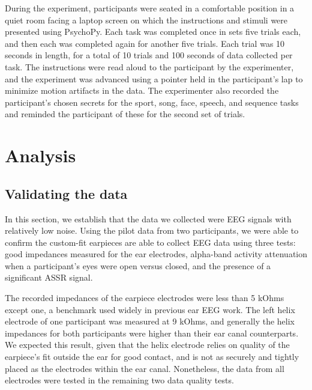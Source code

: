 \documentclass[11pt]{article}
\begin{document}
During the experiment, participants were seated in a comfortable position in a quiet room facing a laptop screen on which the
instructions and stimuli were presented using PsychoPy. Each task was completed once in sets five trials each, and then
each was completed again for another five trials. Each trial was 10 seconds in length, for a total of 10 trials and 
100 seconds of data collected per task. The instructions were read aloud to the participant by the experimenter, and
the experiment was advanced using a pointer held in the participant's lap to minimize motion artifacts in the data.  
The experimenter also recorded the participant's chosen secrets for the sport, song, face, speech, and sequence
 tasks and reminded the participant of these for the second set of trials.
\section{Analysis}
\label{sec:org6c1a839}
\subsection{Validating the data}
\label{sec:org800f2bd}

In this section, we establish that the data we collected were EEG signals with relatively low noise. 
Using the pilot data from two participants, we were able to confirm the custom-fit earpieces are able to collect EEG
data using three tests: good impedances measured for the ear electrodes, alpha-band activity attenuation when a
participant's eyes were open versus closed, and the presence of a significant ASSR signal.

The recorded impedances of the earpiece electrodes were less than 5 kOhms except one, a benchmark used widely in previous
ear EEG work. The left helix electrode of one participant was measured at 9 kOhms, and generally the 
helix impedances for both participants were higher than their ear canal counterparts. We expected this result, given that the
helix electrode relies on quality of the earpiece's fit outside the ear for good contact, and is not as securely and tightly placed as the
electrodes within the ear canal. Nonetheless, the data from all electrodes were tested in the remaining two data quality tests.
\end{document}
